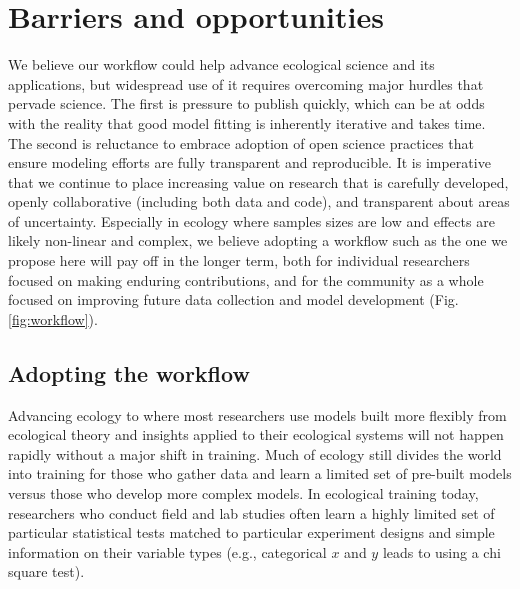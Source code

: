 \documentclass[11pt]{article}
\begin{document}
\section{Barriers and opportunities}

We believe our workflow could help advance ecological science and its applications, but widespread use of it requires overcoming major hurdles that pervade science.  
The first is pressure to publish quickly, which can be at odds with the reality that good model fitting is inherently iterative and takes time. The second is reluctance to embrace adoption of open science practices that ensure modeling efforts are fully transparent and reproducible. It is imperative that we continue to place increasing value on research that is carefully developed, openly collaborative (including both data and code), and transparent about areas of uncertainty. Especially in ecology where samples sizes are low and effects are likely non-linear and complex, we believe adopting a workflow such as the one we propose here will pay off in the longer term, both for individual researchers focused on making enduring contributions, and for the community as a whole focused on improving future data collection and model development (Fig. \ref{fig:workflow}).

\subsection{Adopting the workflow}

Advancing ecology to where most researchers use models built more flexibly from ecological theory and insights applied to their ecological systems will not happen rapidly without a major shift in training. Much of ecology still divides the world into training for those who gather data and learn a limited set of pre-built models versus those who develop more complex models. In ecological training today, researchers who conduct field and lab studies often learn a highly limited set of particular statistical tests matched to particular experiment designs and simple information on their variable types (e.g., categorical $x$ and $y$ leads to using a chi square test).
\end{document}
